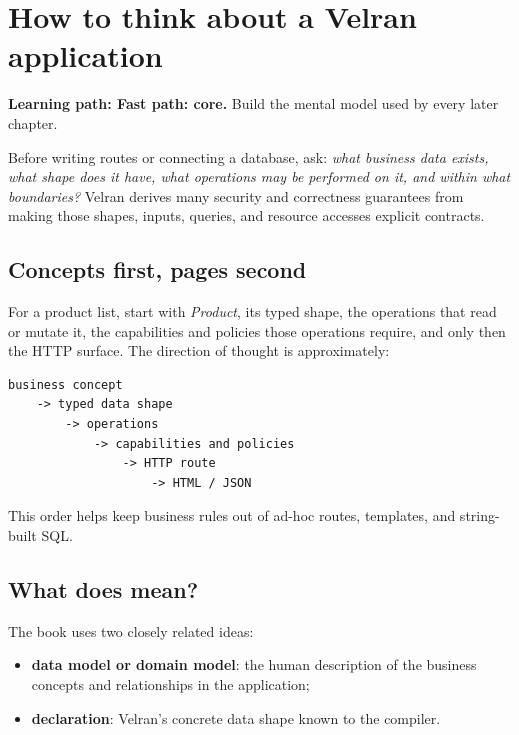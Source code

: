 \chapter{How to think about a Velran application}

\noindent\textbf{Learning path: Fast path: core.} Build the mental model used by every later chapter.\par\medskip



Before writing routes or connecting a database, ask: \emph{what business data exists, what shape does it have, what operations may be performed on it, and within what boundaries?} Velran derives many security and correctness guarantees from making those shapes, inputs, queries, and resource accesses explicit contracts.

\section{Concepts first, pages second}

For a product list, start with \emph{Product}, its typed shape, the operations that read or mutate it, the capabilities and policies those operations require, and only then the HTTP surface. The direction of thought is approximately:

\begin{lstlisting}
business concept
    -> typed data shape
        -> operations
            -> capabilities and policies
                -> HTTP route
                    -> HTML / JSON
\end{lstlisting}

This order helps keep business rules out of ad-hoc routes, templates, and string-built SQL.

\section{What does  mean?}

The book uses two closely related ideas:

\begin{itemize}
  \item \textbf{data model or domain model}: the human description of the business concepts and relationships in the application;
  \item \textbf{ declaration}: Velran's concrete data shape known to the compiler.
\end{itemize}

